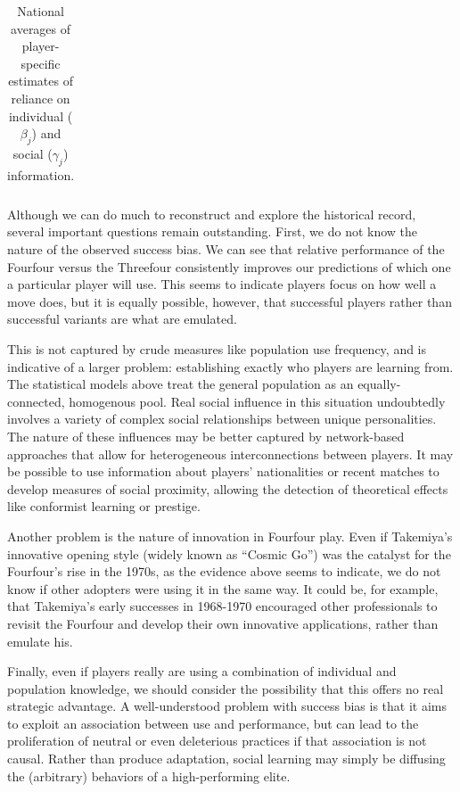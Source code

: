 \documentclass[reqno,12pt]{amsart}
\begin{document}
\begin{table}[t]
  \centering
    \begin{tabular}{lrrrrr}
    
    \end{tabular}
    \caption{National averages of player-specific estimates of reliance on individual ($\beta_j$) and social ($\gamma_j$) information.}
    \label{table:national_coef_averages}
\end{table}

Although we can do much to reconstruct and explore the historical record, several important questions remain outstanding. First, we do not know the nature of the observed success bias. We can see that relative performance of the Fourfour versus the Threefour consistently improves our predictions of which one a particular player will use. This seems to indicate players focus on how well a move does, but it is equally possible, however, that successful players rather than successful variants are what are emulated.

This is not captured by crude measures like population use frequency, and is indicative of a larger problem: establishing exactly who players are learning from. The statistical models above treat the general population as an equally-connected, homogenous pool. Real social influence in this situation undoubtedly involves a variety of complex social relationships between unique personalities. The nature of these influences may be better captured by network-based approaches that allow for heterogeneous interconnections between players. It may be possible to use information about players' nationalities or recent matches to develop measures of social proximity, allowing the detection of theoretical effects like conformist learning or prestige.

Another problem is the nature of innovation in Fourfour play. Even if Takemiya's innovative opening style (widely known as ``Cosmic Go'') was the catalyst for the Fourfour's rise in the 1970s, as the evidence above seems to indicate, we do not know if other adopters were using it in the same way. It could be, for example, that Takemiya's early successes in 1968-1970 encouraged other professionals to revisit the Fourfour and develop their own innovative applications, rather than emulate his.

Finally, even if players really are using a combination of individual and population knowledge, we should consider the possibility that this offers no real strategic advantage. A well-understood problem with success bias is that it aims to exploit an association between use and performance, but can lead to the proliferation of neutral or even deleterious practices if that association is not causal. Rather than produce adaptation, social learning may simply be diffusing the (arbitrary) behaviors of a high-performing elite.
\end{document}
